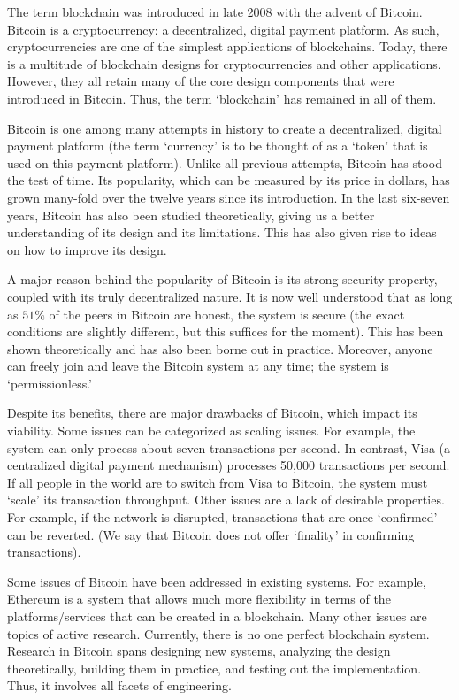 \documentclass{article}
\begin{document}
The term blockchain was introduced in late 2008 with the advent of Bitcoin. Bitcoin is a cryptocurrency: a decentralized, digital payment platform. As such, cryptocurrencies are one of the simplest applications of blockchains. Today, there is a multitude of blockchain designs for cryptocurrencies and other applications. However, they all retain many of the core design components that were introduced in Bitcoin. Thus, the term ‘blockchain’ has remained in all of them.

Bitcoin is one among many attempts in history to create a decentralized, digital payment platform (the term ‘currency’ is to be thought of as a ‘token’ that is used on this payment platform). Unlike all previous attempts, Bitcoin has stood the test of time. Its popularity, which can be measured by its price in dollars, has grown many-fold over the twelve years since its introduction. In the last six-seven years, Bitcoin has also been studied theoretically, giving us a better understanding of its design and its limitations. This has also given rise to ideas on how to improve its design.

A major reason behind the popularity of Bitcoin is its strong security property, coupled with its truly decentralized nature. It is now well understood that as long as $51\%$ of the peers in Bitcoin are honest, the system is secure (the exact conditions are slightly different, but this suffices for the moment). This has been shown theoretically and has also been borne out in practice. Moreover, anyone can freely join and leave the Bitcoin system at any time; the system is ‘permissionless.’

Despite its benefits, there are major drawbacks of Bitcoin, which impact its viability. Some issues can be categorized as scaling issues. For example, the system can only process about seven transactions per second. In contrast, Visa (a centralized digital payment mechanism) processes 50,000 transactions per second. If all people in the world are to switch from Visa to Bitcoin, the system must ‘scale’ its transaction throughput. Other issues are a lack of desirable properties. For example, if the network is disrupted, transactions that are once ‘confirmed’ can be reverted. (We say that Bitcoin does not offer ‘finality’ in confirming transactions).

Some issues of Bitcoin have been addressed in existing systems. For example, Ethereum is a system that allows much more flexibility in terms of the platforms/services that can be created in a blockchain. Many other issues are topics of active research. Currently, there is no one perfect blockchain system. Research in Bitcoin spans designing new systems, analyzing the design theoretically, building them in practice, and testing out the implementation. Thus, it involves all facets of engineering.
\end{document}
